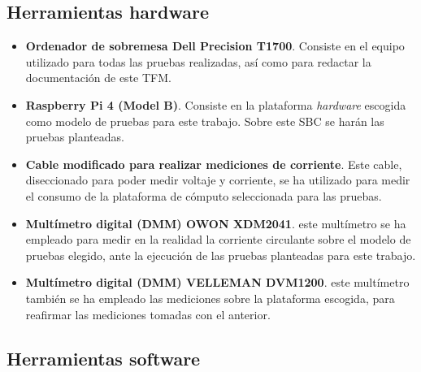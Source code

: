 \subsection{Herramientas hardware}

\begin{itemize}
    \item \textbf{Ordenador de sobremesa Dell Precision T1700}. Consiste en el equipo utilizado para todas las pruebas realizadas, así como para redactar la documentación de este \ac{TFM}.
    
    \item \textbf{Raspberry Pi 4 (Model B)}. Consiste en la plataforma \textit{hardware} escogida como modelo de pruebas para este trabajo. Sobre este \ac{SBC} se harán las pruebas planteadas. 

    \item \textbf{Cable modificado para realizar mediciones de corriente}. Este cable, diseccionado para poder medir voltaje y corriente, se ha utilizado para medir el consumo de la plataforma de cómputo seleccionada para las pruebas.

    \item \textbf{Multímetro digital (\ac{DMM}) OWON XDM2041}. este multímetro se ha empleado para medir en la realidad la corriente circulante sobre el modelo de pruebas elegido, ante la ejecución de las pruebas planteadas para este trabajo.

    \item \textbf{Multímetro digital (\ac{DMM}) VELLEMAN DVM1200}. este multímetro también se ha empleado las mediciones sobre la plataforma escogida, para reafirmar las mediciones tomadas con el anterior.

\end{itemize}

\subsection{Herramientas software}

